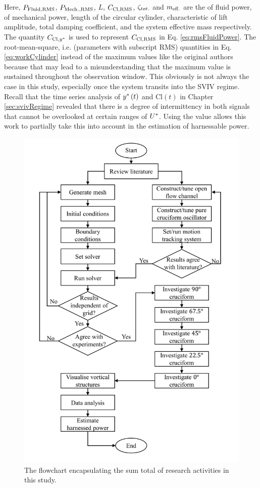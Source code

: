 \documentclass[oneside]{utmthesis}
\begin{document}
Here, $P_{\text{Fluid,RMS}}$, $P_{\text{Mech.,RMS}}$, $L$, $C_{\text{Cl},\text{RMS}}$, $\zeta_{tot.}$ and $m_{\text{eff.}}$ are the \rms{} of fluid power, \rms{} of mechanical power, length of the circular cylinder, characteristic \rms{} of lift amplitude, total damping coefficient, and the system effective mass respectively. The quantity $C_{\text{Cl},y^{*}}$ is used to represent $C_{\text{Cl},\text{RMS}}$ in Eq. \ref{eq:rmsFluidPower}. The root-mean-square, i.e. \rms{} (parameters with subscript RMS) quantities in Eq. \ref{eq:workCylinder} instead of the maximum values like the original authors because that may lead to a misunderstanding that the maximum value is sustained throughout the observation window. This obviously is not always the case in this study, especially once the system transits into the SVIV regime. Recall that the time series analysis of $y^{*}\left( t \right)$ and $\text{Cl}\left( t \right)$ in Chapter \ref{sec:svivRegime} revealed that there is a degree of intermittency in both signals that cannot be overlooked at certain ranges of $U^{*}$. Using the \rms{} value allows this work to partially take this into account in the estimation of harnessable power.

\begin{figure}
  \centering
  \includegraphics[width=1\textwidth]{figs/researchMethodology}
  \caption{The flowchart encapsulating the sum total of research activities in this study.}
  \label{fig:researchMethodologyFlowchart}
\end{figure}
\end{document}
